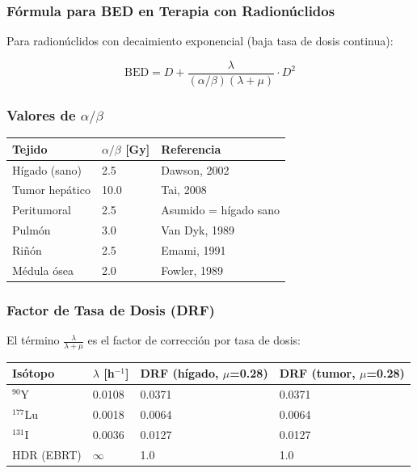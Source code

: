 \documentclass[12pt,a4paper]{article}
\begin{document}
\subsubsection{Fórmula para BED en Terapia con Radionúclidos}

Para radionúclidos con decaimiento exponencial (baja tasa de dosis continua):

$$\text{BED} = D + \frac{\lambda}{(\alpha/\beta)(\lambda + \mu)} \cdot D^2$$


\subsubsection{Valores de $\alpha/\beta$}

\begin{tabular}{p{4cm} p{3cm} p{5cm}}
\toprule
\textbf{Tejido} & $\alpha/\beta$ [Gy] & \textbf{Referencia} \\
\midrule
Hígado (sano) & 2.5 & Dawson, 2002 \\
Tumor hepático & 10.0 & Tai, 2008 \\
Peritumoral & 2.5 & Asumido = hígado sano \\
Pulmón & 3.0 & Van Dyk, 1989 \\
Riñón & 2.5 & Emami, 1991 \\
Médula ósea & 2.0 & Fowler, 1989 \\
\bottomrule
\end{tabular}

\subsubsection{Factor de Tasa de Dosis (DRF)}

El término $\frac{\lambda}{\lambda + \mu}$ es el factor de corrección por tasa de dosis:

\begin{tabular}{p{2cm} p{3cm} p{3.5cm} p{3.5cm}}
\toprule
\textbf{Isótopo} & $\lambda$ [h$^{-1}$] & \textbf{DRF (hígado, $\mu$=0.28)} & \textbf{DRF (tumor, $\mu$=0.28)} \\
\midrule
$^{90}$Y & 0.0108 & 0.0371 & 0.0371 \\
$^{177}$Lu & 0.0018 & 0.0064 & 0.0064 \\
$^{131}$I & 0.0036 & 0.0127 & 0.0127 \\
HDR (EBRT) & $\infty$ & 1.0 & 1.0 \\
\bottomrule
\end{tabular}
\end{document}
